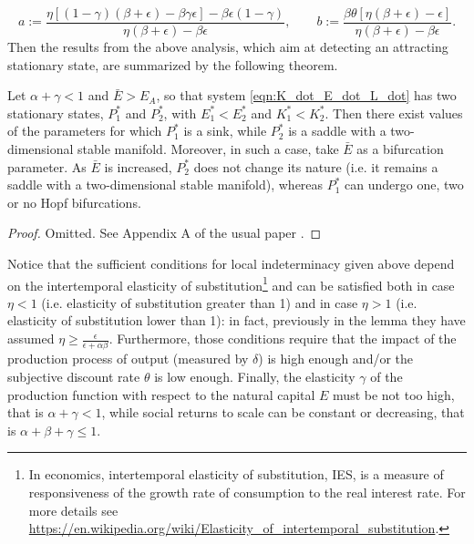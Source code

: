 \begin{equation} \label{eqn:a_b_def}
	a:=\frac{\eta[(1-\gamma)(\beta+\epsilon)-\beta\gamma\epsilon]-\beta\epsilon(1-\gamma)}{\eta(\beta+\epsilon)-\beta\epsilon}, \qquad b:=\frac{\beta\theta[\eta(\beta+\epsilon)-\epsilon]}{\eta(\beta+\epsilon)-\beta\epsilon}.
\end{equation}
Then the results from the above analysis, which aim at detecting an attracting stationary state, are summarized by the following theorem.
\begin{thm} \label{thm:result_of_analysis}
	Let $\alpha+\gamma<1$ and $\bar{E}>E_A$, so that system \eqref{eqn:K_dot_E_dot_L_dot} has two stationary states, $P_1^*$ and $P_2^*$, with $E_1^*<E_2^*$ and $K_1^*<K_2^*$. Then there exist values of the parameters for which $P_1^*$ is a sink, while $P_2^*$ is a saddle with a two-dimensional stable manifold. Moreover, in such a case, take $\bar{E}$ as a bifurcation parameter. As $\bar{E}$ is increased, $P_2^*$ does not change its nature (i.e. it remains a saddle with a two-dimensional stable manifold), whereas $P_1^*$ can undergo one, two or no Hopf bifurcations.
\end{thm}
\begin{proof}
	Omitted. See Appendix A of the usual paper \cite{antoci_poverty_2011}.
\end{proof}
Notice that the sufficient conditions for local indeterminacy given above depend on the intertemporal elasticity of substitution\footnote{In economics, intertemporal elasticity of substitution, IES, is a measure of responsiveness of the growth rate of consumption to the real interest rate. For more details see \url{https://en.wikipedia.org/wiki/Elasticity_of_intertemporal_substitution}.} 
and can be satisfied both in case $\eta<1$ (i.e. elasticity of substitution greater than 1) and in case $\eta>1$ (i.e. elasticity of substitution lower than 1): in fact, previously in the lemma they have assumed $\eta\geq \frac{\epsilon}{\epsilon+\alpha\beta}$. Furthermore, those conditions require that the impact of the production process of output (measured by $\delta$) is high enough and/or the subjective discount rate $\theta$ is low enough. Finally, the elasticity $\gamma$ of the production function with respect to the natural capital $E$ must be not too high, that is $\alpha+\gamma<1$, while social returns to scale can be constant or decreasing, that is $\alpha+\beta+\gamma\leq1$.


